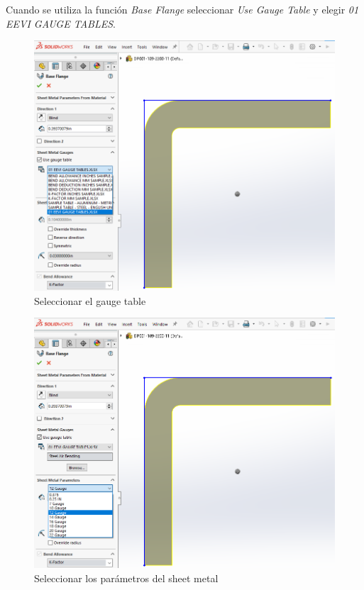 \documentclass[12pt,letterpaper,final]{report}
\begin{document}
Cuando se utiliza la función \emph{Base Flange} seleccionar \emph{Use Gauge Table} y elegir \emph{01 EEVI GAUGE TABLES}.

\begin{figure}[H]
	\centering
	\includegraphics[width=0.95\linewidth, height=0.5\textheight,keepaspectratio]{Imagenes/solidworks_sheetmetalgauge_04}
	\caption{Seleccionar el gauge table}
	\label{fig:solidworkssheetmetalgauge04}
\end{figure}

\begin{figure}[H]
	\centering
	\includegraphics[width=0.95\linewidth, height=0.5\textheight,keepaspectratio]{Imagenes/solidworks_sheetmetalgauge_05}
	\caption{Seleccionar los parámetros del sheet metal}
	\label{fig:solidworkssheetmetalgauge05}
\end{figure}
\end{document}
